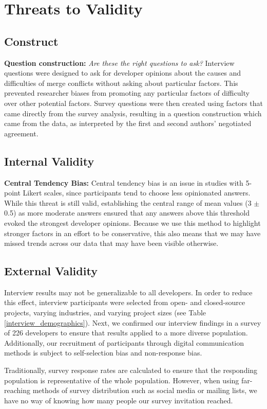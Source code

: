 \section{Threats to Validity}\label{threats}
\subsection{Construct}
\textbf{Question construction:}
\textit{Are these the right questions to ask?} Interview questions were designed to ask for developer opinions about the causes and difficulties of merge conflicts without asking about particular factors. This prevented researcher biases from promoting any particular factors of difficulty over other potential factors. 
Survey questions were then created using factors that came directly from the survey analysis, resulting in a question construction which came from the data, as interpreted by the first and second authors' negotiated agreement.
\subsection{Internal Validity}
\textbf{Central Tendency Bias:}
Central tendency bias \cite{guilford1954psychometric} is an issue in studies with 5-point Likert scales, since participants tend to choose less opinionated answers. While this threat is still valid, establishing the central range of mean values (3 $\pm$ 0.5) as more moderate answers ensured that any answers above this threshold evoked the strongest developer opinions. Because we use this method to highlight stronger factors in an effort to be conservative, this also means that we may have missed trends across our data that may have been visible otherwise.

\subsection{External Validity}
Interview results may not be generalizable to all developers. In order to reduce this effect, interview participants were selected from open- and closed-source projects, varying industries, and varying project sizes (see Table \ref{interview_demographics}). Next, we confirmed our interview findings in a survey of 226 developers to ensure that results applied to a more diverse population. Additionally, our recruitment of participants through digital communication methods is subject to self-selection bias and non-response bias.

Traditionally, survey response rates are calculated to ensure that the responding population is representative of the whole population. However, when using far-reaching methods of survey distribution such as social media or mailing lists, we have no way of knowing how many people our survey invitation reached.

